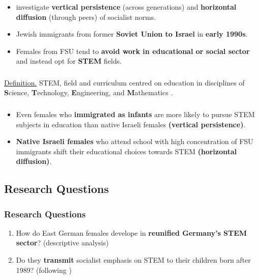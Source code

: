 \documentclass[11pt, aspectratio=1610, xcolor={dvipsnames}]{beamer}
\newcommand{\highlight}[1]{\textbf{\textcolor{PineGreen}{#1}}}
\begin{document}
	\begin{frame}
		\frametitle{}
		
		\begin{itemize}
			\item \cite{FriedmanSokuler2020} investigate \highlight{vertical persistence} (across generations) and \highlight{horizontal diffusion} (through peers) of socialist norms.
			\item Jewish immigrants from former \highlight{Soviet Union to Israel} in \highlight{early 1990s}.
			\item Females from FSU tend to \highlight{avoid work in educational or social sector} and instead opt for \highlight{STEM} fields.
		\end{itemize}
		
	\end{frame}
	
	\begin{frame}
		\frametitle{}
		
		\textcolor{PineGreen}{\underline{Definition.}} STEM, field and curriculum centred on education in disciplines of \textbf{S}cience, \textbf{T}echnology, \textbf{E}ngineering, and \textbf{M}athematics \textcolor{darkgray}{\citep{Hallinen2024}}.
		
	\end{frame}
	
	\begin{frame}
		\frametitle{}
		
		\begin{itemize}
			\item Even females who \highlight{immigrated as infants} are more likely to pursue STEM subjects in education than native Israeli females \highlight{(vertical persistence)}.
			\item \highlight{Native Israeli females} who attend school with high concentration of FSU immigrants shift their educational choices towards STEM \highlight{(horizontal diffusion)}.
		\end{itemize}
		
	\end{frame}
	
	\subsection{Research Questions}
	\begin{frame}
		\frametitle{Research Questions}
		
		\begin{enumerate}
			\item How do East German females develope in \highlight{reunified Germany's STEM sector}? (descriptive analysis)
			\item Do they \highlight{transmit} socialist emphasis on STEM to their children born after 1989? (following \cite{Fernandez2011})
		\end{enumerate}
		
	\end{frame}
	
\end{document}
